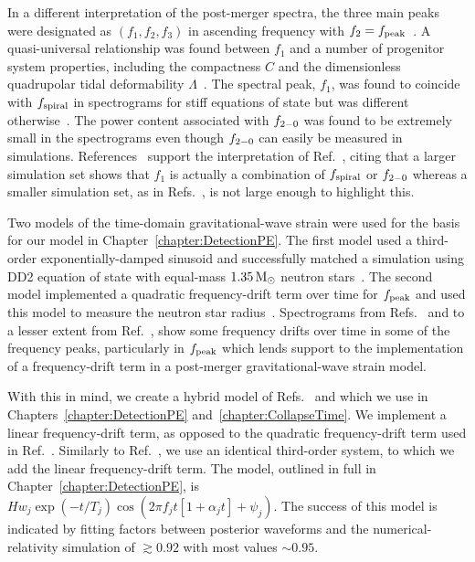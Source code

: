 \documentclass[../Thesis.tex]{subfiles}
\begin{document}
    
    In a different interpretation of the post-merger spectra, the three main peaks were designated as $(f_1, f_2, f_3)$ in ascending frequency with $f_2 = f_{\mathrm{peak}}$~\cite{Takami2014,Takami2015,Rezzolla2016}.
    A quasi-universal relationship was found between $f_1$ and a number of progenitor system properties, including the compactness $C$ and the dimensionless quadrupolar tidal deformability $\Lambda$~\cite{Takami2015}.
    The spectral peak, $f_1$, was found to coincide with $f_{\mathrm{spiral}}$ in spectrograms for stiff equations of state but was different otherwise~\cite{Rezzolla2016}.
    The power content associated with $f_{2-0}$ was found to be extremely small in the spectrograms  even though $f_{2-0}$ can easily be measured in simulations.
    References~\cite{Bauswein2019a,Vretinaris2019} support the interpretation of Ref.~\cite{Bauswein2015}, citing that a larger simulation set shows that $f_1$ is actually a combination of $f_{\mathrm{spiral}}$ or $f_{2-0}$ whereas a smaller simulation set, as in Refs.~\cite{Takami2014,Takami2015,Rezzolla2016}, is not large enough to highlight this.
\par
    
 
    
    Two models of the time-domain gravitational-wave strain were used for the basis for our model in Chapter~\ref{chapter:DetectionPE}.
    The first model used a third-order exponentially-damped sinusoid and successfully matched a simulation using DD2 equation of state with equal-mass $1.35\,\mathrm{M}_{\odot}$ neutron stars~\cite{Bauswein2016}.
    The second model implemented a quadratic frequency-drift term over time for $f_{\mathrm{peak}}$ and used this model  to measure the neutron star radius~\cite{Bose2018}.
    Spectrograms from Refs.~\cite{Rezzolla2016,Dietrich2017,Dietrich2017a} and to a lesser extent from Ref.~\cite{Maione2017}, show some frequency drifts over time in some of the frequency peaks, particularly in $f_{\mathrm{peak}}$ which lends support to the implementation of a frequency-drift term in a post-merger gravitational-wave strain model.
      \par
    
    With this in mind, we create a hybrid model of Refs.~\cite{Bauswein2016} and \cite{Bose2018} which we use in Chapters~\ref{chapter:DetectionPE} and~\ref{chapter:CollapseTime}. 
    We implement a linear frequency-drift term, as opposed to the quadratic frequency-drift term used in Ref.~\cite{Bose2018}.
    Similarly to Ref.~\cite{Bauswein2016}, we use an identical third-order system, to which we add the linear frequency-drift term.
    The model, outlined in full in Chapter~\ref{chapter:DetectionPE}, is $H w_j \exp(-t/T_j) \cos \left(2\pi f_j t\left[1+\alpha_j t\right]+\psi_j \right)$.
    The success of this model is indicated by fitting factors between posterior waveforms and the numerical-relativity simulation of $\gtrsim 0.92$ with most values $\sim 0.95$.
    \par
    
\end{document}

